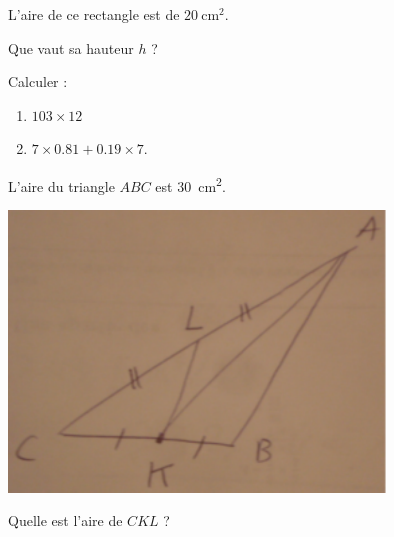 \begin{MentalActivity}
    \begin{mental}
                L'aire de ce rectangle est de \(\SI{20}{\centi\meter\squared}\).
        \begin{center}
           
        \end{center}
        Que vaut sa hauteur \( h\) ?
    \end{mental}

    \begin{mental}
        Calculer :
        \begin{enumerate}
            \item
                \( 103\times 12\)
            \item
                \( 7\times 0.81+0.19\times 7\).
        \end{enumerate}
    \end{mental}
    \begin{mental}
        L'aire du triangle \( ABC\) est \SI{30}{\centi\meter\squared}.

        \includegraphics[width=10cm]{DSC01734.pdf}

        Quelle est l'aire de \( CKL\) ?
    \end{mental}
\end{MentalActivity}

